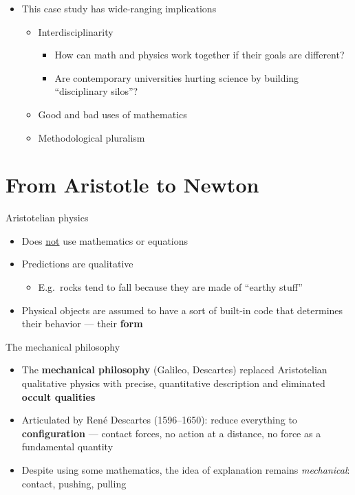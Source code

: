 \documentclass[fleqn]{beamer}
\newcommand{\kw}[1]{\textbf{#1}}
\begin{document}
\begin{frame}

  \begin{itemize}
  \item This case study has wide-ranging implications
  \begin{itemize}
    \item Interdisciplinarity
    \begin{itemize}
      \item How can math and physics work together if their goals are
        different?
      \item Are contemporary universities hurting science by building
        ``disciplinary silos''?
    \end{itemize}
    \item Good and bad uses of mathematics
    \item Methodological pluralism
  \end{itemize}
  \end{itemize}

\end{frame}

\section{From Aristotle to Newton}

\begin{frame}{Aristotelian physics}

  \begin{itemize}
  \item Does \ul{not} use mathematics or equations
  \item Predictions are qualitative
    \begin{itemize}
    \item E.g.\ rocks tend to fall because they are made of ``earthy
      stuff''
    \end{itemize}
  \item Physical objects are assumed to have a sort of built-in code
    that determines their behavior --- their \kw{form}
  \end{itemize}

\end{frame}

\begin{frame}{The mechanical philosophy}

  \begin{itemize}
  \item The \kw{mechanical philosophy} (Galileo, Descartes) replaced
    Aristotelian qualitative physics with precise, quantitative
    description and eliminated \kw{occult qualities}
  \item Articulated by Ren{\'e} Descartes (1596--1650): reduce
    everything to \kw{configuration} --- contact forces, no action at
    a distance, no force as a fundamental quantity
  \item Despite using some mathematics, the idea of explanation
    remains \emph{mechanical}: contact, pushing, pulling
  \end{itemize}

\end{frame}
\end{document}
